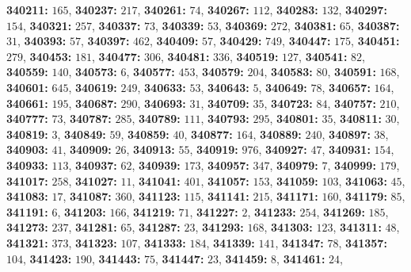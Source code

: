 \textsf{\bfseries 340211:} $165$, \textsf{\bfseries 340237:} $217$, \textsf{\bfseries 340261:} $74$, \textsf{\bfseries 340267:} $112$, \textsf{\bfseries 340283:} $132$, \textsf{\bfseries 340297:} $154$, \textsf{\bfseries 340321:} $257$, \textsf{\bfseries 340337:} $73$, \textsf{\bfseries 340339:} $53$, \textsf{\bfseries 340369:} $272$, \textsf{\bfseries 340381:} $65$, \textsf{\bfseries 340387:} $31$, \textsf{\bfseries 340393:} $57$, \textsf{\bfseries 340397:} $462$, \textsf{\bfseries 340409:} $57$, \textsf{\bfseries 340429:} $749$, \textsf{\bfseries 340447:} $175$, \textsf{\bfseries 340451:} $279$, \textsf{\bfseries 340453:} $181$, \textsf{\bfseries 340477:} $306$, \textsf{\bfseries 340481:} $336$, \textsf{\bfseries 340519:} $127$, \textsf{\bfseries 340541:} $82$, \textsf{\bfseries 340559:} $140$, \textsf{\bfseries 340573:} $6$, \textsf{\bfseries 340577:} $453$, \textsf{\bfseries 340579:} $204$, \textsf{\bfseries 340583:} $80$, \textsf{\bfseries 340591:} $168$, \textsf{\bfseries 340601:} $645$, \textsf{\bfseries 340619:} $249$, \textsf{\bfseries 340633:} $53$, \textsf{\bfseries 340643:} $5$, \textsf{\bfseries 340649:} $78$, \textsf{\bfseries 340657:} $164$, \textsf{\bfseries 340661:} $195$, \textsf{\bfseries 340687:} $290$, \textsf{\bfseries 340693:} $31$, \textsf{\bfseries 340709:} $35$, \textsf{\bfseries 340723:} $84$, \textsf{\bfseries 340757:} $210$, \textsf{\bfseries 340777:} $73$, \textsf{\bfseries 340787:} $285$, \textsf{\bfseries 340789:} $111$, \textsf{\bfseries 340793:} $295$, \textsf{\bfseries 340801:} $35$, \textsf{\bfseries 340811:} $30$, \textsf{\bfseries 340819:} $3$, \textsf{\bfseries 340849:} $59$, \textsf{\bfseries 340859:} $40$, \textsf{\bfseries 340877:} $164$, \textsf{\bfseries 340889:} $240$, \textsf{\bfseries 340897:} $38$, \textsf{\bfseries 340903:} $41$, \textsf{\bfseries 340909:} $26$, \textsf{\bfseries 340913:} $55$, \textsf{\bfseries 340919:} $976$, \textsf{\bfseries 340927:} $47$, \textsf{\bfseries 340931:} $154$, \textsf{\bfseries 340933:} $113$, \textsf{\bfseries 340937:} $62$, \textsf{\bfseries 340939:} $173$, \textsf{\bfseries 340957:} $347$, \textsf{\bfseries 340979:} $7$, \textsf{\bfseries 340999:} $179$, \textsf{\bfseries 341017:} $258$, \textsf{\bfseries 341027:} $11$, \textsf{\bfseries 341041:} $401$, \textsf{\bfseries 341057:} $153$, \textsf{\bfseries 341059:} $103$, \textsf{\bfseries 341063:} $45$, \textsf{\bfseries 341083:} $17$, \textsf{\bfseries 341087:} $360$, \textsf{\bfseries 341123:} $115$, \textsf{\bfseries 341141:} $215$, \textsf{\bfseries 341171:} $160$, \textsf{\bfseries 341179:} $85$, \textsf{\bfseries 341191:} $6$, \textsf{\bfseries 341203:} $166$, \textsf{\bfseries 341219:} $71$, \textsf{\bfseries 341227:} $2$, \textsf{\bfseries 341233:} $254$, \textsf{\bfseries 341269:} $185$, \textsf{\bfseries 341273:} $237$, \textsf{\bfseries 341281:} $65$, \textsf{\bfseries 341287:} $23$, \textsf{\bfseries 341293:} $168$, \textsf{\bfseries 341303:} $123$, \textsf{\bfseries 341311:} $48$, \textsf{\bfseries 341321:} $373$, \textsf{\bfseries 341323:} $107$, \textsf{\bfseries 341333:} $184$, \textsf{\bfseries 341339:} $141$, \textsf{\bfseries 341347:} $78$, \textsf{\bfseries 341357:} $104$, \textsf{\bfseries 341423:} $190$, \textsf{\bfseries 341443:} $75$, \textsf{\bfseries 341447:} $23$, \textsf{\bfseries 341459:} $8$, \textsf{\bfseries 341461:} $24$, 
